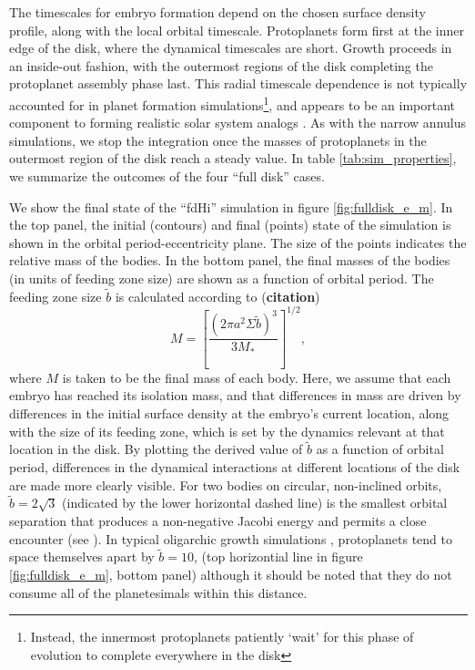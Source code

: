 \documentclass[twocolumn]{aastex63}
\begin{document}
The timescales for embryo formation depend on
the chosen surface density profile, along with the local orbital
timescale. Protoplanets form first at the inner edge of the disk,
where the dynamical timescales are short. Growth proceeds in an
inside-out fashion, with the outermost regions of the disk completing
the protoplanet assembly phase last. This radial timescale dependence is not typically
accounted for in planet formation simulations\footnote{Instead, the innermost protoplanets 
patiently `wait' for this phase of evolution to complete everywhere in the disk}, and appears to be an
important component to forming realistic solar system analogs
\citep{clement20}. As with the narrow annulus simulations, we stop the
integration once the masses of protoplanets in the outermost region of
the disk reach a steady value. In table \ref{tab:sim_properties}, we
summarize the outcomes of the four ``full disk'' cases.

We show the final state of the ``fdHi'' simulation in figure \ref{fig:fulldisk_e_m}. In the top panel,
the initial (contours) and final (points) state of the simulation is
shown in the orbital period-eccentricity plane. The size of the points
indicates the relative mass of the bodies. In the bottom panel, the
final masses of the bodies (in units of feeding zone size) are shown
as a function of orbital period. The feeding zone size $\tilde{b}$ is
calculated according to ({\bf citation})
\begin{equation}\label{eq:iso}
	M = \left[ \frac{\left( 2 \pi a^2 \Sigma \tilde{b} \right)^3}{3 M_{*}} \right]^{1/2},
\end{equation}
where $M$ is taken to be the final mass of each body. Here, we assume that each embryo has reached its isolation mass, and 
that differences in mass are driven by differences in the initial surface density at the embryo's current location, along with the 
size of its feeding zone, which is set by the dynamics relevant at that location in the disk. By plotting the derived value of $
\tilde{b}$ as a function of orbital period, differences in the dynamical interactions at different locations of the disk are made more 
clearly visible. For two bodies on circular, non-inclined orbits,  $\tilde{b} = 2
\sqrt{3}$ (indicated by the lower horizontal dashed line) is the smallest orbital separation that produces a non-negative Jacobi energy
and permits a close encounter (see \citet{naka88}). In typical oligarchic growth simulations \citep{kokubo98}, protoplanets tend 
to space themselves apart by $\tilde{b} = 10$, (top horizontial line in
figure \ref{fig:fulldisk_e_m}, bottom panel) although it should be noted that they do not consume all of the planetesimals 
within this distance.
\end{document}
